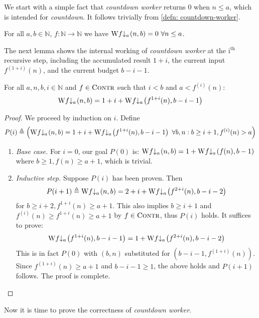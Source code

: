 We start with a simple fact that \emph{countdown worker} returns $0$ when $n\le a$, which is intended for \emph{countdown}. It follows trivially from \cref{defn: countdown-worker}.

\begin{lem} \label{lem: cdt-init}
	For all $a, b\in \mathbb{N}$, $f : \mathbb{N}\to \mathbb{N}$ we have $\W\cdt{f}{a} (n, b) = 0 \ \forall n\le a$.
\end{lem}

The next lemma shows the internal working of \emph{countdown worker} at the $\text{i}^\text{th}$ recursive step, including the accumulated result $1+i$, the current input $f^{(1+i)}(n)$, and the current budget $b-i-1$.

\begin{lem} \label{lem: cdt-intermediate}
	For all $a, n, b, i\in \mathbb{N}$ and $f \in \text{\scshape{Contr}}$ such that $i < b$ and $a < f^{(i)}(n)$:
	\begin{equation}  \label{eq: cdt-intermediate}
	\W\cdt{f}{a}(n, b) = 1 + i + \W\cdt{f}{a}\left(f^{1+i}(n), b - i - 1\right)
	\end{equation}
\end{lem}
\begin{proof}
	We proceed by induction on $i$. Define
	\begin{equation*}
	P(i) \triangleq \left(\W\cdt{f}{a}(n, b) = 1 + i + \W\cdt{f}{a}\left(f^{1+i}(n), b - i - 1\right) \ \forall b, n : b\ge i+1, f^{(i)}(n) > a\right)
	\end{equation*}
	\begin{enumerate}[leftmargin=*]
		\item \textit{Base case.} For $i = 0$, our goal $P(0)$ is:
		$\W\cdt{f}{a}(n, b) = 1 + \W\cdt{f}{a}\left(f(n), b - 1\right)$
		where $b \ge 1, f(n)\ge a+1$, which is trivial.
		\item \textit{Inductive step.} Suppose $P(i)$ has been proven. Then
		\begin{equation*}
		P(i+1) \triangleq \W\cdt{f}{a}(n, b) = 2 + i + \W\cdt{f}{a}\left( f^{2+i}(n), b - i - 2 \right)
		\end{equation*}
		for $b \ge i+2, f^{1+i}(n) \ge a+1$. This also implies $b\ge i+1$ and $\displaystyle f^{(i)}(n) \ge f^{1+i}(n)\ge a+1$ by $f\in \text{\scshape{Contr}}$, thus $P(i)$ holds. It suffices to prove:
		\begin{equation*}
		\W\cdt{f}{a}\left(f^{1+i}(n), b-i-1\right) = 1 + \W\cdt{f}{a}\left( f^{2+i}(n), b-i-2 \right)
		\end{equation*}
		This is in fact $P(0)$ with $(b, n)$ substituted for $\left(b-i-1, f^{(1+i)}(n)\right)$. Since $f^{(1+i)}(n) \ge a+1$ and $b-i-1\ge 1$, the above holds and $P(i+1)$ follows. The proof is complete.\vspace*{-\baselineskip}
	\end{enumerate}
\end{proof}
Now it is time to prove the correctness of \emph{countdown worker}. 

